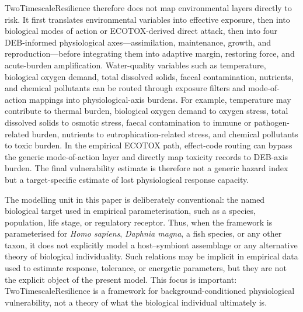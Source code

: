 TwoTimescaleResilience therefore does not map environmental layers directly to risk. It first translates environmental variables into effective exposure, then into biological modes of action or ECOTOX-derived direct attack, then into four DEB-informed physiological axes---assimilation, maintenance, growth, and reproduction---before integrating them into adaptive margin, restoring force, and acute-burden amplification. Water-quality variables such as temperature, biological oxygen demand, total dissolved solids, faecal contamination, nutrients, and chemical pollutants can be routed through exposure filters and mode-of-action mappings into physiological-axis burdens. For example, temperature may contribute to thermal burden, biological oxygen demand to oxygen stress, total dissolved solids to osmotic stress, faecal contamination to immune or pathogen-related burden, nutrients to eutrophication-related stress, and chemical pollutants to toxic burden. In the empirical ECOTOX path, effect-code routing can bypass the generic mode-of-action layer and directly map toxicity records to DEB-axis burden. The final vulnerability estimate is therefore not a generic hazard index but a target-specific estimate of lost physiological response capacity.

The modelling unit in this paper is deliberately conventional: the named biological target used in empirical parameterisation, such as a species, population, life stage, or regulatory receptor. Thus, when the framework is parameterised for \emph{Homo sapiens}, \emph{Daphnia magna}, a fish species, or any other taxon, it does not explicitly model a host--symbiont assemblage or any alternative theory of biological individuality. Such relations may be implicit in empirical data used to estimate response, tolerance, or energetic parameters, but they are not the explicit object of the present model. This focus is important: TwoTimescaleResilience is a framework for background-conditioned physiological vulnerability, not a theory of what the biological individual ultimately is.

